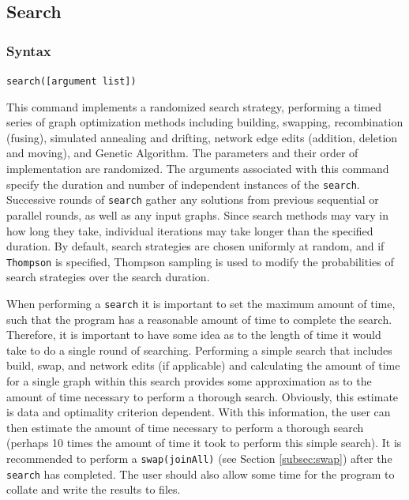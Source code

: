 \subsection{Search}
\label{subsec:search}
	\subsubsection{Syntax}
		\texttt{search([argument list])}
	
	\begin{phygdescription}
		{This command implements a randomized search strategy, performing a timed 
		 series of graph optimization methods including building, swapping, 
		recombination (fusing), simulated annealing and drifting, network edge edits
		(addition, deletion and moving), and Genetic Algorithm. The parameters and 
		their order of implementation are randomized. The arguments 
		associated with this command specify the duration and number of independent 
		instances of the \texttt{search}. Successive rounds of \texttt{search} gather any 
		solutions from previous sequential or parallel rounds, as well as any input graphs. 
		Since search methods may vary in how long they take, individual iterations may 
		take longer than the specified duration. By default, search strategies are chosen 
		uniformly at random, and if \texttt{Thompson} is specified, Thompson sampling 
		\cite{Thompson1933,WheelerThompson} is used to modify the probabilities 
		of search strategies over the search duration.
		
		When performing a \texttt{search} it is important to set the maximum amount of time, 
		such that the program has a reasonable amount of time to complete the search. 
		Therefore, it is important to have some idea as to the length of time it would take 
		to do a single round of searching. Performing a simple search that includes 
		build, swap, and network edits (if applicable) and calculating the amount of time 
		for a single graph within this search provides some approximation as to the amount 
		of time necessary to perform a thorough search. Obviously, this estimate is data and 
		optimality criterion dependent. With this information, the user can then estimate the 
		amount of time necessary to perform a thorough search (perhaps 10 times the 
		amount of time it took to perform this simple search). It is recommended to perform 
		a \texttt{swap(joinAll)} (see Section \ref{subsec:swap}) after the \texttt{search} has 
		completed. The user should also allow some time for the program to collate and 
		write the results to files.}
	\end{phygdescription}
			
